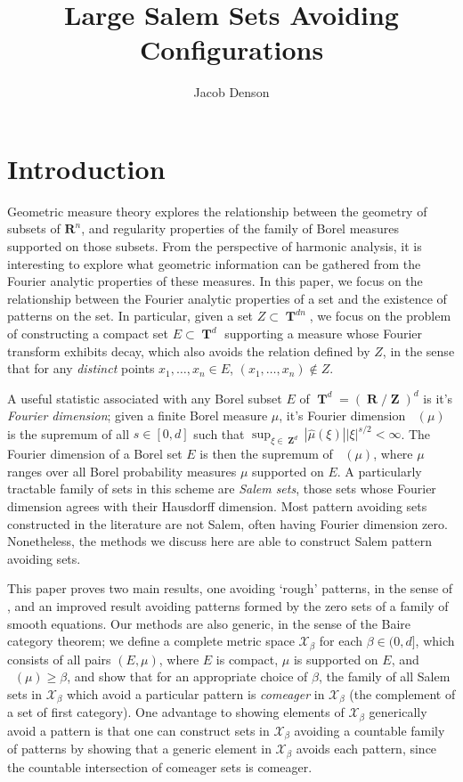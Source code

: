 \documentclass[12pt,reqno]{article}
\title{Large Salem Sets Avoiding Configurations}
\author{Jacob Denson}
\numberwithin{equation}{section}
\DeclareMathOperator{\fordim}{\dim_{\mathbf{F}}}
\DeclareMathOperator{\RR}{\mathbf{R}}
\DeclareMathOperator{\ZZ}{\mathbf{Z}}
\DeclareMathOperator{\TT}{\mathbf{T}}
\numberwithin{theorem}{section}
\begin{document}
\maketitle

\section{Introduction}

Geometric measure theory explores the relationship between the geometry of subsets of $\mathbf{R}^n$, and regularity properties of the family of Borel measures supported on those subsets. From the perspective of harmonic analysis, it is interesting to explore what geometric information can be gathered from the Fourier analytic properties of these measures. In this paper, we focus on the relationship between the Fourier analytic properties of a set and the existence of patterns on the set. In particular, given a set $Z \subset \TT^{dn}$, we focus on the problem of constructing a compact set $E \subset \TT^d$ supporting a measure whose Fourier transform exhibits decay, which also avoids the relation defined by $Z$, in the sense that for any \emph{distinct} points $x_1,\dots,x_n \in E$, $(x_1,\dots,x_n) \not \in Z$.


A useful statistic associated with any Borel subset $E$ of $\TT^d = (\RR/\ZZ)^d$ is it's \emph{Fourier dimension}; given a finite Borel measure $\mu$, it's Fourier dimension $\fordim(\mu)$ is the supremum of all $s \in [0,d]$ such that $\sup_{\xi \in \ZZ^d} |\widehat{\mu}(\xi)| |\xi|^{s/2} < \infty$. The Fourier dimension of a Borel set $E$ is then the supremum of $\fordim(\mu)$, where $\mu$ ranges over all Borel probability measures $\mu$ supported on $E$. A particularly tractable family of sets in this scheme are \emph{Salem sets}, those sets whose Fourier dimension agrees with their Hausdorff dimension. Most pattern avoiding sets constructed in the literature are not Salem, often having Fourier dimension zero. Nonetheless, the methods we discuss here are able to construct Salem pattern avoiding sets.

This paper proves two main results, one avoiding `rough' patterns, in the sense of \cite{OurPaper}, and an improved result avoiding patterns formed by the zero sets of a family of smooth equations. Our methods are also generic, in the sense of the Baire category theorem; we define a complete metric space $\mathcal{X}_\beta$ for each $\beta \in (0,d]$, which consists of all pairs $(E,\mu)$, where $E$ is compact, $\mu$ is supported on $E$, and $\fordim(\mu) \geq \beta$, and show that for an appropriate choice of $\beta$, the family of all Salem sets in $\mathcal{X}_\beta$ which avoid a particular pattern is \emph{comeager} in $\mathcal{X}_\beta$ (the complement of a set of first category). One advantage to showing elements of $\mathcal{X}_\beta$ generically avoid a pattern is that one can construct sets in $\mathcal{X}_\beta$ avoiding a countable family of patterns by showing that a generic element in $\mathcal{X}_\beta$ avoids each pattern, since the countable intersection of comeager sets is comeager.
\end{document}
